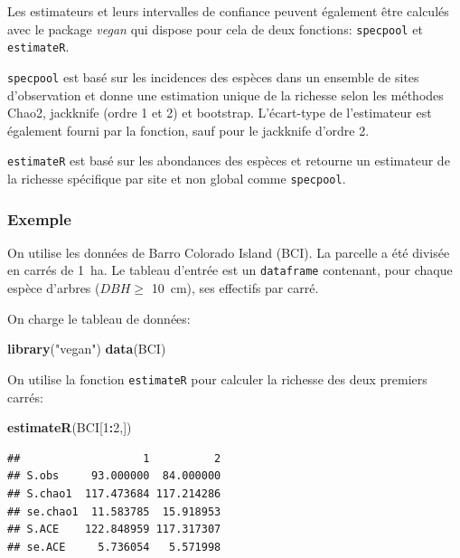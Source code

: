\documentclass[
  11pt,
  american,
  a4paper,
  extrafontsizes,onecolumn,openright
  ]{memoir}
\newenvironment{Shaded}{\begin{snugshade}}{\end{snugshade}}
\newcommand{\DecValTok}[1]{\textcolor[rgb]{0.00,0.00,0.81}{#1}}
\newcommand{\FunctionTok}[1]{\textcolor[rgb]{0.13,0.29,0.53}{\textbf{#1}}}
\newcommand{\NormalTok}[1]{#1}
\newcommand{\SpecialCharTok}[1]{\textcolor[rgb]{0.81,0.36,0.00}{\textbf{#1}}}
\newcommand{\StringTok}[1]{\textcolor[rgb]{0.31,0.60,0.02}{#1}}
\begin{document}
Les estimateurs et leurs intervalles de confiance peuvent également être calculés avec le package \emph{vegan} qui dispose pour cela de deux fonctions: \texttt{specpool} et \texttt{estimateR}.

\texttt{specpool} est basé sur les incidences des espèces dans un ensemble de sites d'observation et donne une estimation unique de la richesse selon les méthodes Chao2, jackknife (ordre 1 et 2) et bootstrap.
L'écart-type de l'estimateur est également fourni par la fonction, sauf pour le jackknife d'ordre 2.

\texttt{estimateR} est basé sur les abondances des espèces et retourne un estimateur de la richesse spécifique par site et non global comme \texttt{specpool}.

\subsubsection{Exemple}\label{exemple}

On utilise les données de Barro Colorado Island (BCI).
La parcelle a été divisée en carrés de 1~ha.
Le tableau d'entrée est un \texttt{dataframe} contenant, pour chaque espèce d'arbres (\(\mathit{DBH}\ge\) 10~cm), ses effectifs par carré.

On charge le tableau de données:

\scriptsize

\begin{Shaded}
\begin{Highlighting}[]
\FunctionTok{library}\NormalTok{(}\StringTok{"vegan"}\NormalTok{)}
\FunctionTok{data}\NormalTok{(BCI)}
\end{Highlighting}
\end{Shaded}

\normalsize

On utilise la fonction \texttt{estimateR} pour calculer la richesse des deux premiers carrés:

\scriptsize

\begin{Shaded}
\begin{Highlighting}[]
\FunctionTok{estimateR}\NormalTok{(BCI[}\DecValTok{1}\SpecialCharTok{:}\DecValTok{2}\NormalTok{,])}
\end{Highlighting}
\end{Shaded}

\begin{verbatim}
##                   1          2
## S.obs     93.000000  84.000000
## S.chao1  117.473684 117.214286
## se.chao1  11.583785  15.918953
## S.ACE    122.848959 117.317307
## se.ACE     5.736054   5.571998
\end{verbatim}
\end{document}

